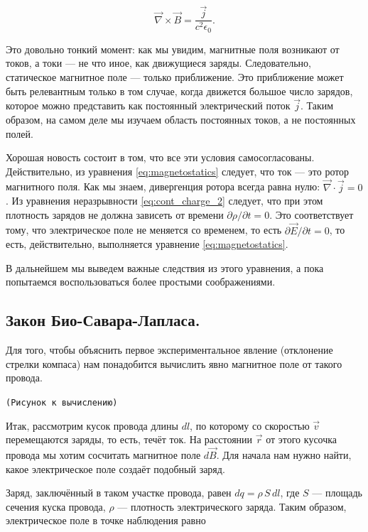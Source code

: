\documentclass[a4paper,12pt]{article}
\numberwithin{equation}{section}
\newcommand{\pt}{\partial}
\newcommand{\eps}{\epsilon}
\newcommand{\com}[1]{{\Large{\texttt{{\color{red}(#1)}}}}}
\newcommand{\vn}{\vec{\nabla}}
\begin{document}
\begin{equation}
  \label{eq:magnetostatics}
  \vn \times \vec{B} = \frac{\vec{j}}{c^2\eps_0}.
\end{equation}

Это довольно тонкий момент: как мы увидим, магнитные поля возникают от
токов, а токи --- не что иное, как движущиеся заряды. Следовательно,
статическое магнитное поле --- только приближение. Это приближение
может быть релевантным только в том случае, когда движется большое
число зарядов, которое можно представить как постоянный электрический
поток $\vec{j}$. Таким образом, на самом деле мы изучаем область
постоянных токов, а не постоянных полей. 

Хорошая новость состоит в том, что все эти условия
самосогласованы. Действительно, из уравнения \eqref{eq:magnetostatics}
следует, что ток --- это ротор магнитного поля. Как мы знаем,
дивергенция ротора всегда равна нулю: $\vn \cdot \vec{j} =0$. Из
уравнения неразрывности \eqref{eq:cont_charge_2} следует, что при этом
плотность зарядов не должна зависеть от времени $\pt \rho / \pt t
=0$. Это соответствует тому, что электрическое поле не меняется со
временем, то есть $\pt \vec{E}/ \pt t =0$, то есть, действительно,
выполняется уравнение \eqref{eq:magnetostatics}.

В дальнейшем мы выведем важные следствия из этого уравнения, а пока
попытаемся воспользоваться более простыми соображениями. 

\subsection{Закон Био-Савара-Лапласа.}
\label{sec:biot_savart_law}

Для того, чтобы объяснить первое экспериментальное явление (отклонение
стрелки компаса) нам понадобится вычислить явно магнитное поле от
такого провода. 

\com{Рисунок к вычислению}

Итак, рассмотрим кусок провода длины $dl$, по которому со скоростью
$\vec{v}$ перемещаются заряды, то есть, течёт ток. На расстоянии
$\vec{r}$ от этого кусочка провода мы хотим сосчитать магнитное поле
$d\vec{B}$. Для начала нам нужно найти, какое электрическое поле
создаёт подобный заряд.

Заряд, заключённый в таком участке провода, равен $dq = \rho\, S\,
dl$, где $S$ — площадь сечения куска провода, $\rho$ — плотность
электрического заряда. Таким образом, электрическое поле в точке
наблюдения равно 
\end{document}
